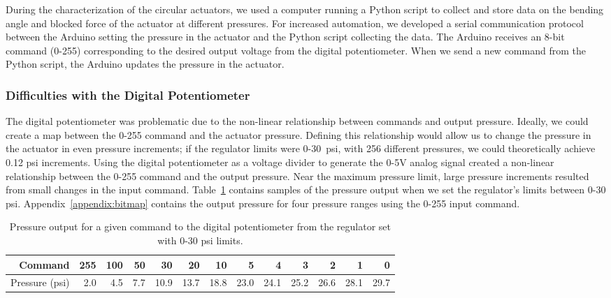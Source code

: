 During the characterization of the circular actuators, we used a computer running a Python script to collect and store data on the bending angle and blocked force of the actuator at different pressures. For increased automation, we developed a serial communication protocol between the Arduino setting the pressure in the actuator and the Python script collecting the data. The Arduino receives an 8-bit command (0-255) corresponding to the desired output voltage from the digital potentiometer. When we send a new command from the Python script, the Arduino updates the pressure in the actuator. 

\subsubsection{Difficulties with the Digital Potentiometer}

The digital potentiometer was problematic due to the non-linear relationship between commands and output pressure. Ideally, we could create a map between the 0-255 command and the actuator pressure. Defining this relationship would allow us to change the pressure in the actuator in even pressure increments; if the regulator limits were 0-30~psi, with 256 different pressures, we could theoretically achieve 0.12 psi increments. Using the digital potentiometer as a voltage divider to generate the 0-5V analog signal created a non-linear relationship between the 0-255 command and the output pressure. Near the maximum pressure limit, large pressure increments resulted from small changes in the input command. Table~\ref{table:bitmap} contains samples of the pressure output when we set the regulator's limits between 0-30 psi. Appendix~\ref{appendix:bitmap} contains the output pressure for four pressure ranges using the 0-255 input command. \\

\begin{table}[ht]
    \centering
    \begin{tabular}{|r|r|r|r|r|r|r|r|r|r|r|r|r|}
        \hline
        Command  & 255 & 100 & 50  & 30   & 20   & 10   & 5    & 4    & 3    & 2    & 1    & 0    \\ \hline
        Pressure (psi) & 2.0 & 4.5 & 7.7 & 10.9 & 13.7 & 18.8 & 23.0 & 24.1 & 25.2 & 26.6 & 28.1 & 29.7 \\ \hline
    \end{tabular}
    \caption{Pressure output for a given command to the digital potentiometer from the regulator set with 0-30 psi limits.}
    \label{table:bitmap}
\end{table}

